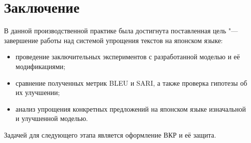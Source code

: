 \chapter*{Заключение} \label{ch-conclusion}

В данной производственной практике была достигнута поставленная цель "--- завершение работы над системой упрощения текстов на японском языке:
\begin{itemize}%
  \item проведение заключительных экспериментов с разработанной моделью и её модификациями;
  \item сравнение полученных метрик BLEU и SARI, а также проверка гипотезы об их улучшении;
  \item анализ упрощения конкретных предложений на японском языке изначальной и улучшенной моделью.
\end{itemize}

Задачей для следующего этапа является оформление ВКР и её защита.

